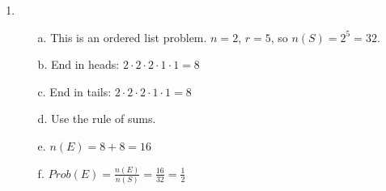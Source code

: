 {\begin{enumerate}
        \item
            \begin{itemize}
                \item[a.]   This is an ordered list problem. $n = 2$, $r = 5$, so $n(S) = 2^{5} = 32$.
                \item[b.]   End in heads: $2 \cdot 2 \cdot 2 \cdot 1 \cdot 1 = 8$
                \item[c.]   End in tails: $2 \cdot 2 \cdot 2 \cdot 1 \cdot 1 = 8$
                \item[d.]   Use the rule of sums.
                \item[e.]   $n(E) = 8 + 8 = 16$
                \item[f.]   $Prob(E) = \frac{n(E)}{n(S)} = \frac{16}{32} = \frac{1}{2}$
            \end{itemize}

    \end{enumerate}

}


